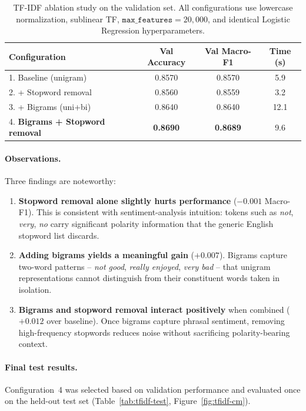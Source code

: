 \documentclass[11pt,a4paper]{article}
\begin{document}
\begin{table}[H]
\centering
\caption{TF-IDF ablation study on the validation set. All configurations use lowercase normalization, sublinear TF, $\texttt{max\_features}=20{,}000$, and identical Logistic Regression hyperparameters.}
\label{tab:tfidf-ablation}
\begin{tabular}{lccc}
\toprule
\textbf{Configuration} & \textbf{Val Accuracy} & \textbf{Val Macro-F1} & \textbf{Time (s)} \\
\midrule
1. Baseline (unigram)              & 0.8570 & 0.8570 & 5.9 \\
2. + Stopword removal              & 0.8560 & 0.8559 & 3.2 \\
3. + Bigrams (uni+bi)              & 0.8640 & 0.8640 & 12.1 \\
4. \textbf{Bigrams + Stopword removal} & \textbf{0.8690} & \textbf{0.8689} & 9.6 \\
\bottomrule
\end{tabular}
\end{table}

\paragraph{Observations.} Three findings are noteworthy:
\begin{enumerate}[noitemsep]
    \item \textbf{Stopword removal alone slightly hurts performance} ($-0.001$ Macro-F1). This is consistent with sentiment-analysis intuition: tokens such as \emph{not}, \emph{very}, \emph{no} carry significant polarity information that the generic English stopword list discards.
    \item \textbf{Adding bigrams yields a meaningful gain} ($+0.007$). Bigrams capture two-word patterns -- \emph{not good}, \emph{really enjoyed}, \emph{very bad} -- that unigram representations cannot distinguish from their constituent words taken in isolation.
    \item \textbf{Bigrams and stopword removal interact positively} when combined ($+0.012$ over baseline). Once bigrams capture phrasal sentiment, removing high-frequency stopwords reduces noise without sacrificing polarity-bearing context.
\end{enumerate}

\paragraph{Final test results.} Configuration~4 was selected based on validation performance and evaluated once on the held-out test set (Table~\ref{tab:tfidf-test}, Figure~\ref{fig:tfidf-cm}).
\end{document}
